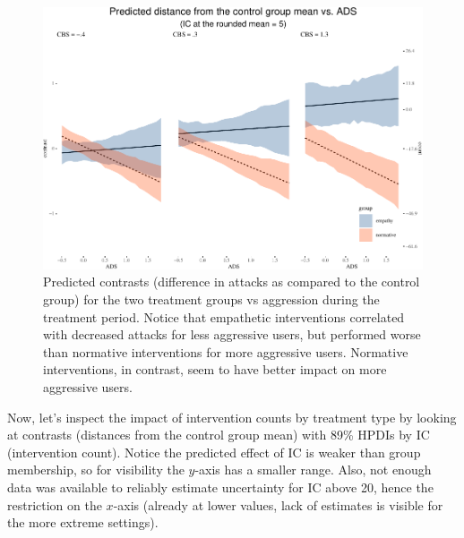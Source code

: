 \documentclass[preprint,12pt]{elsarticle}
\begin{document}
\begin{figure}

\begin{center}\includegraphics[width=1\linewidth]{ figures/unnamed-chunk-9-1} \end{center}
\caption{Predicted contrasts (difference in attacks as compared to the control group)
for the two treatment groups vs aggression during the treatment period.
Notice that empathetic interventions correlated with decreased attacks for
less aggressive users, but performed worse than normative interventions for
more aggressive users. Normative interventions, in contrast, seem to have
better impact on  more aggressive users.}
\label{fig:ContrastADS}
\end{figure}




Now, let's inspect the impact of intervention counts by treatment type
by looking at contrasts (distances from the control group mean) with
89\% HPDIs by IC (intervention count). Notice the predicted effect of IC
is weaker than group membership, so for visibility the \(y\)-axis has a
smaller range. Also, not enough data was available to reliably estimate
uncertainty for IC above 20, hence the restriction on the \(x\)-axis
(already at lower values, lack of estimates is visible for the more
extreme settings).
\end{document}
